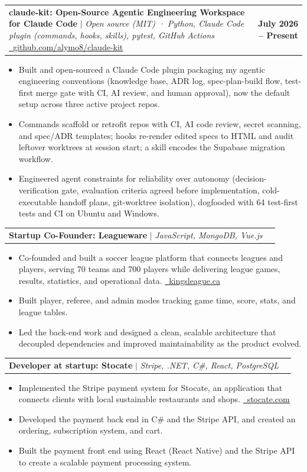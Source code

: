\documentclass[letterpaper,11pt]{article}
\makeatletter
\newcommand{\resumeItem}[1]{
  \item\small{{#1 \vspace{-2pt}}}
}
\newcommand{\resumeProjectHeading}[2]{
    \item
    \begin{tabular*}{1.001\textwidth}{@{}>{\raggedright\arraybackslash}p{0.80\textwidth}@{\extracolsep{\fill}}r@{}}
      \small#1 & \textbf{\small #2}\\
    \end{tabular*}\vspace{-7pt}
}
\newcommand{\resumeItemListStart}{\begin{itemize}}
\newcommand{\resumeItemListEnd}{\end{itemize}\vspace{-5pt}}
\makeatother
\begin{document}
      \resumeProjectHeading
        {\textbf{claude-kit: Open-Source Agentic Engineering Workspace for Claude Code} $|$ \emph{Open source (MIT) · Python, Claude Code plugin (commands, hooks, skills), pytest, GitHub Actions} \href{https://github.com/alymo8/claude-kit}{\raisebox{-0.2\height}\ \underline{github.com/alymo8/claude-kit}}}{July 2026 -- Present}
        \resumeItemListStart
          \resumeItem{Built and open-sourced a Claude Code plugin packaging my agentic engineering conventions (knowledge base, ADR log, spec-plan-build flow, test-first merge gate with CI, AI review, and human approval), now the default setup across three active project repos.}
          \resumeItem{Commands scaffold or retrofit repos with CI, AI code review, secret scanning, and spec/ADR templates; hooks re-render edited specs to HTML and audit leftover worktrees at session start; a skill encodes the Supabase migration workflow.}
          \resumeItem{Engineered agent constraints for reliability over autonomy (decision-verification gate, evaluation criteria agreed before implementation, cold-executable handoff plans, git-worktree isolation), dogfooded with 64 test-first tests and CI on Ubuntu and Windows.}
        \resumeItemListEnd
        \vspace{-13pt}
      \resumeProjectHeading
        {\textbf{Startup Co-Founder: Leagueware} $|$ \emph{JavaScript, MongoDB, Vue.js}}{}
        \resumeItemListStart
          \resumeItem{Co-founded and built a soccer league platform that connects leagues and players, serving 70 teams and 700 players while delivering league games, results, statistics, and operational data. \href{https://kingsleague.ca/}{\raisebox{-0.2\height}\ \underline{kingsleague.ca}}}
          \resumeItem{Built player, referee, and admin modes tracking game time, score, stats, and league tables.}
          \resumeItem{Led the back-end work and designed a clean, scalable architecture that decoupled dependencies and improved maintainability as the product evolved.}
        \resumeItemListEnd
        \vspace{-13pt}

      \resumeProjectHeading
        {\textbf{Developer at startup: Stocate} $|$ \emph{Stripe, .NET, C\#, React, PostgreSQL}}{}
        \resumeItemListStart
          \resumeItem{Implemented the Stripe payment system for Stocate, an application that connects clients with local sustainable restaurants and shops. \href{https://stocate.com/}{\raisebox{-0.2\height}\ \underline{stocate.com}}}
          \resumeItem{Developed the payment back end in C\# and the Stripe API, and created an ordering, subscription system, and cart.}
          \resumeItem{Built the payment front end using React (React Native) and the Stripe API to create a scalable payment processing system.}
        \resumeItemListEnd
        \vspace{-13pt}
\end{document}
